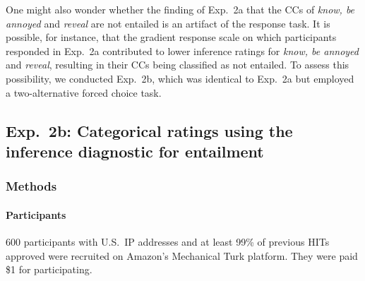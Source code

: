 \documentclass[11pt,fleqn]{article}
\newcommand{\6}{\mbox{$[\hspace*{-.6mm}[$}}
\newcommand{\9}{\mbox{$]\hspace*{-.6mm}]$}}
\begin{document}

One might also wonder whether the finding of Exp.~2a that the CCs of {\em know, be annoyed} and {\em reveal} are not entailed is an artifact of the response task. It is possible, for instance, that the gradient response scale on which participants responded in Exp.~2a contributed to lower inference ratings for {\em know, be annoyed} and {\em reveal}, resulting in their CCs being classified as not entailed. To assess this possibility, we conducted Exp.~2b, which was identical to Exp.~2a but employed a two-alternative forced choice task.

\subsection{Exp.~2b: Categorical ratings using the inference diagnostic for entailment}

\subsubsection{Methods}

\paragraph{Participants} 600 participants with U.S.\ IP addresses and at least 99\% of previous HITs approved were recruited on Amazon's Mechanical Turk platform. They were paid \$1 for participating.
\end{document}
